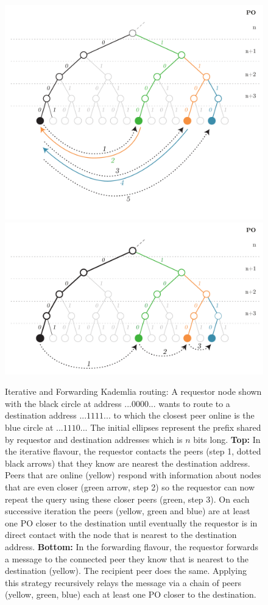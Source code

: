 \begin{figure}[htbp]
   \centering
   \vspace{-2cm}
   \includegraphics[width=.8\textwidth]{fig/iterative-kademlia.pdf}\\\vspace{-1.3cm}
   \includegraphics[width=.8\textwidth]{fig/forwarding-kademlia-3.pdf}
   \caption[Iterative and Forwarding Kademlia routing \statusgreen]{Iterative and Forwarding Kademlia routing: A requestor node shown with the black circle at address $...0000...$ wants to route to a destination address $...1111...$ to which the closest peer online is the blue circle at $...1110...$ The initial ellipses represent the prefix shared by requestor and destination addresses which is $n$ bits long. \textbf{Top:} In the iterative flavour, the requestor contacts the peers (step 1, dotted black arrows) that they know are nearest the destination address. Peers that are online (yellow) respond with information about nodes that are even closer (green arrow, step 2) so the requestor can now repeat the query using these closer peers (green, step 3). On each successive iteration the peers (yellow, green and blue) are at least one PO closer to the destination until eventually the requestor is in direct contact with the node that is nearest to the destination address. \textbf{Bottom:} In the forwarding flavour, the requestor forwards a message to the connected peer they know that is nearest to the destination (yellow). The recipient peer does the same. Applying this strategy recursively relays the message via a chain of peers (yellow, green, blue) each at least one PO closer to the destination.}
   \label{fig:iterative-forwarding-kademlia}
\end{figure}


